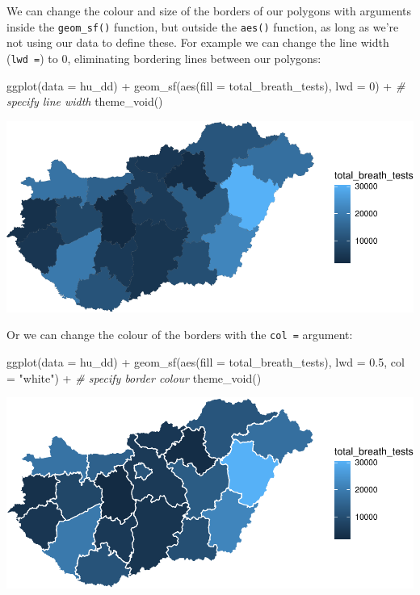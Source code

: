 \documentclass[
]{book}
\makeatletter
\newenvironment{Shaded}{\begin{snugshade}}{\end{snugshade}}
\newcommand{\AttributeTok}[1]{\textcolor[rgb]{0.61,0.61,0.61}{#1}}
\newcommand{\CommentTok}[1]{\textcolor[rgb]{0.37,0.37,0.37}{\textit{#1}}}
\newcommand{\DecValTok}[1]{\textcolor[rgb]{0.06,0.06,0.06}{#1}}
\newcommand{\FloatTok}[1]{\textcolor[rgb]{0.06,0.06,0.06}{#1}}
\newcommand{\FunctionTok}[1]{\textcolor[rgb]{0,0,0}{#1}}
\newcommand{\NormalTok}[1]{#1}
\newcommand{\SpecialCharTok}[1]{\textcolor[rgb]{0,0,0}{#1}}
\newcommand{\StringTok}[1]{\textcolor[rgb]{0.5,0.5,0.5}{#1}}
\newenvironment{kframe}{%
\medskip{}
\setlength{\fboxsep}{.8em}
 \def\at@end@of@kframe{}%
 \ifinner\ifhmode%
  \def\at@end@of@kframe{\end{minipage}}%
  \begin{minipage}{\columnwidth}%
 \fi\fi%
 \def\FrameCommand##1{\hskip\@totalleftmargin \hskip-\fboxsep
 \colorbox{shadecolor}{##1}\hskip-\fboxsep
     \hskip-\linewidth \hskip-\@totalleftmargin \hskip\columnwidth}%
 \MakeFramed {\advance\hsize-\width
   \@totalleftmargin\z@ \linewidth\hsize
   \@setminipage}}%
 {\par\unskip\endMakeFramed%
 \at@end@of@kframe}
\renewenvironment{Shaded}{\begin{kframe}}{\end{kframe}}
\makeatother
\begin{document}
We can change the colour and size of the borders of our polygons with arguments inside the \texttt{geom\_sf()} function, but outside the \texttt{aes()} function, as long as we're not using our data to define these. For example we can change the line width (\texttt{lwd\ =}) to 0, eliminating bordering lines between our polygons:

\begin{Shaded}
\begin{Highlighting}[]
\FunctionTok{ggplot}\NormalTok{(}\AttributeTok{data =}\NormalTok{ hu\_dd) }\SpecialCharTok{+} 
  \FunctionTok{geom\_sf}\NormalTok{(}\FunctionTok{aes}\NormalTok{(}\AttributeTok{fill =}\NormalTok{ total\_breath\_tests), }
          \AttributeTok{lwd =} \DecValTok{0}\NormalTok{) }\SpecialCharTok{+}  \CommentTok{\# specify line width}
  \FunctionTok{theme\_void}\NormalTok{()}
\end{Highlighting}
\end{Shaded}

\includegraphics{crime_mapping_files/figure-latex/themmapnobord-1.pdf}

Or we can change the colour of the borders with the \texttt{col\ =} argument:

\begin{Shaded}
\begin{Highlighting}[]
\FunctionTok{ggplot}\NormalTok{(}\AttributeTok{data =}\NormalTok{ hu\_dd) }\SpecialCharTok{+} 
  \FunctionTok{geom\_sf}\NormalTok{(}\FunctionTok{aes}\NormalTok{(}\AttributeTok{fill =}\NormalTok{ total\_breath\_tests), }
          \AttributeTok{lwd =} \FloatTok{0.5}\NormalTok{, }
          \AttributeTok{col =} \StringTok{"white"}\NormalTok{) }\SpecialCharTok{+} \CommentTok{\# specify border colour}
  \FunctionTok{theme\_void}\NormalTok{()}
\end{Highlighting}
\end{Shaded}

\includegraphics{crime_mapping_files/figure-latex/themmapwhitebord-1.pdf}
\end{document}
